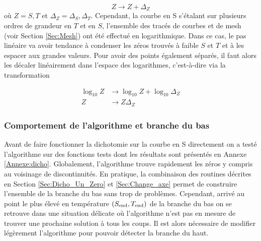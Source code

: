\documentclass[a4paper,12pt]{article}
\begin{document}
            \begin{equation}
              \label{Eq:StepLin}
              Z \rightarrow Z + \Delta_Z
            \end{equation}
            où $Z = S, T$ et $\Delta_Z = \Delta_S, \Delta_T$. Cependant, la courbe en S s'étalant sur plusieurs ordres de grandeur en $T$ et en $S$, l'ensemble des tracés de courbes et de mesh (voir Section \ref{Sec:Mesh}) ont été effectué en logarithmique. Dans ce cas, le pas linéaire va avoir tendance à condenser les zéros trouvés à faible $S$ et $T$ et à les espacer aux grandes valeurs. Pour avoir des points également séparés, il faut alors les décaler linéairement dans l'espace des logarithmes, c'est-à-dire via la transformation
            
            \begin{align}
              \log_{10} Z & \rightarrow \log_{10} Z + \log_{10} \Delta_Z \\
              \label{Eq:StepLog}
              Z & \rightarrow Z \Delta_Z
            \end{align}
         
         \subsubsection{Comportement de l'algorithme et branche du bas}
            \label{Sec:Branche_bas}
            Avant de faire fonctionner la dichotomie sur la courbe en S directement on a testé l'algorithme sur des fonctions tests dont les résultats sont présentés en Annexe \ref{Annexe:dicho}. Globalement, l'algorithme trouve rapidement les zéros y compris au voisinage de discontinuités.\newline
            En pratique, la combinaison des routines décrites en Section \ref{Sec:Dicho_Un_Zero} et \ref{Sec:Change_axe} permet de construire l'ensemble de la branche du bas sans trop de problèmes. Cependant, arrivé au point le plus élevé en température $(S_{\rm{end}} , T_{\rm{end}})$ de la branche du bas on se retrouve dans une situation délicate où l'algorithme n'est pas en mesure de trouver une prochaine solution à tous les coups. Il est alors nécessaire de modifier légèrement l'algorithme pour pouvoir détecter la branche du haut.
         
\end{document}
